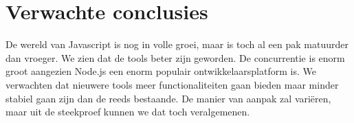 \section{Verwachte conclusies}
\label{sec:verwachte_conclusies}

De wereld van Javascript is nog in volle groei, maar is toch al een pak matuurder dan vroeger. We zien dat de tools beter zijn geworden. De concurrentie is enorm groot aangezien Node.js een enorm populair ontwikkelaarsplatform is. We verwachten dat nieuwere tools meer functionaliteiten gaan bieden maar minder stabiel gaan zijn dan de reeds bestaande. De manier van aanpak zal variëren, maar uit de steekproef kunnen we dat toch veralgemenen.

